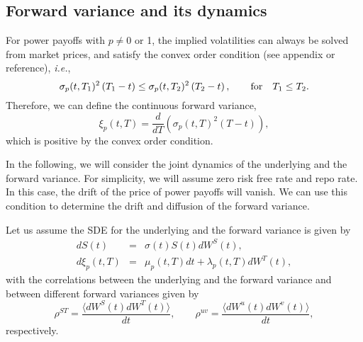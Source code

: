 \documentclass[12pt]{article}
\begin{document}
  \subsection{Forward variance and its dynamics}

    For power payoffs with $p\neq 0$ or 1, the implied volatilities can always be solved from market prices, and satisfy the convex order
    condition (see appendix or reference), {\it i.e.},
    \begin{equation}
      \sigma_p(t,T_1)^2\left(T_1-t\right) \leq \sigma_p(t,T_2)^2\left(T_2-t\right),\quad\quad {\rm for} \quad T_1 \leq T_2.
    \end{equation}
    Therefore, we can define the continuous forward variance,
    \begin{equation}
      \xi_p(t,T) = \frac{d}{dT}\left(\sigma_p(t,T)^2\left(T-t\right)\right),
    \end{equation}
    which is positive by the convex order condition.

    In the following, we will consider the joint dynamics of the underlying and the forward variance. For simplicity, we will assume zero
    risk free rate and repo rate. In this case, the drift of the price of power payoffs will vanish. We can use this condition
    to determine the drift and diffusion of the forward variance.

    Let us assume the SDE for the underlying and the forward variance is given by
    \begin{eqnarray}
      dS(t) &=& \sigma(t)S(t)dW^S(t),\nonumber\\
      d\xi_p(t,T) &=& \mu_p(t,T)dt + \lambda_p(t,T)dW^T(t),\nonumber
    \end{eqnarray}
    with the correlations between the underlying and the forward variance and between different forward variances given by
    \begin{equation}
      \rho^{ST} = \frac{\langle dW^S(t)dW^T(t)\rangle}{dt}, \quad\quad \rho^{uv} = \frac{\langle dW^u(t)dW^v(t)\rangle}{dt},
    \end{equation}
    respectively.
\end{document}
